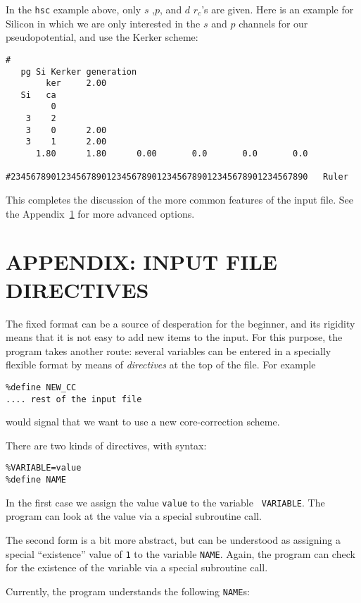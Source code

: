 \documentclass[11pt]{article}
\begin{document}
In the {\tt hsc} example above, only $s$ ,$p$, and $d$ $r_c$'s are
given. Here is an example for Silicon in which we are only interested
in the $s$ and $p$ channels for our pseudopotential, and use the Kerker
scheme:

\begin{verbatim}
# 
   pg Si Kerker generation
        ker     2.00
   Si   ca
         0
    3    2
    3    0      2.00
    3    1      2.00
      1.80      1.80      0.00       0.0       0.0       0.0

#23456789012345678901234567890123456789012345678901234567890   Ruler
\end{verbatim}


This completes the discussion of the more common features of the input
file. See the Appendix~\ref{sec:directives} for more advanced options.

\section{APPENDIX: INPUT FILE DIRECTIVES}
\label{sec:directives}

The fixed format can be a source of desperation for the beginner, and
its rigidity means that it is not easy to add new items to the
input. For this purpose, the program takes another route: several
variables can be entered in a specially flexible format by means of
{\sl directives} at the top of the file. For example

\begin{verbatim}
%define NEW_CC
.... rest of the input file
\end{verbatim}

would signal that we want to use a new core-correction scheme.

There are two kinds of directives, with syntax:
\begin{verbatim}
%VARIABLE=value
%define NAME
\end{verbatim}

In the first case we assign the value {\tt value} to the variable {\tt
 VARIABLE}. The program can look at the value via a special
 subroutine call.

The second form is a bit more abstract, but can be understood as
assigning a special ``existence'' value of {\tt 1} to the variable
{\tt NAME}.  Again, the program can check for the existence of the
variable via a special subroutine call.

Currently, the program understands the following {\tt NAME}s:
\end{document}
